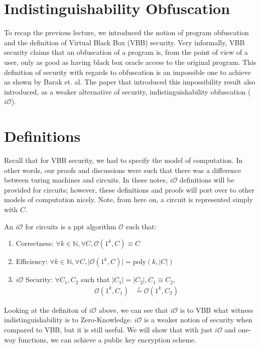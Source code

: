 \documentclass{article}
\newcommand{\ci}{\stackrel{c}{=}}
\newcommand{\io}{i\mathcal{O}}
\begin{document}
\section{Indistinguishability Obfuscation}

To recap the previous lecture, we introduced the notion of program obfuscation and the definition of Virtual Black Box (VBB) security. Very informally, VBB security claims that an obfuscation of a program is, from the point of view of a user, only as good as having black box oracle access to the original program. This definition of security with regards to obfuscation is an impossible one to achieve as shown by Barak et. al. The paper that introduced this impossibility result also introduced, as a weaker alternative of security, indistinguishability obfuscation ($\io$).

\section{Definitions}
Recall that for VBB security, we had to specify the model of computation. In other words, our proofs and discussions were such that there was a difference between turing machines and circuits. In these notes, $\io$ definitions will be provided for circuits; however, these definitions and proofs will port over to other models of computation nicely. Note, from here on, a circuit is represented simply with $C$.

    An $\io$ for circuits is a ppt algorithm $\mathcal{O}$ such that:
        \begin{enumerate}
            \item Correctness: $\forall{k}\in\mathbb{N}, \forall{C}, \mathcal{O}(1^k, C) \equiv C$
            \item Efficiency: $\forall{k}\in\mathbb{N}, \forall{C}, \lvert \mathcal{O}(1^k, C) \rvert = \text{poly}(k, \lvert C \rvert)$
            \item $\io$ Security: $\forall{C_1,C_2}$ such that $\lvert C_1 \rvert = \lvert C_2 \rvert, C_1 \equiv C_2$,
                \begin{align*}
                    \mathcal{O}(1^k, C_1) & \ci \mathcal{O}(1^k, C_2)
                \end{align*}
        \end{enumerate}

\noindent
Looking at the definiton of $\io$ above, we can see that $\io$ is to VBB what witness indistinguishability is to Zero-Knowledge. $\io$ is a weaker notion of security when compared to VBB, but it is still useful. We will show that with just $\io$ and one-way functions, we can achieve a public key encryption scheme.
\end{document}
